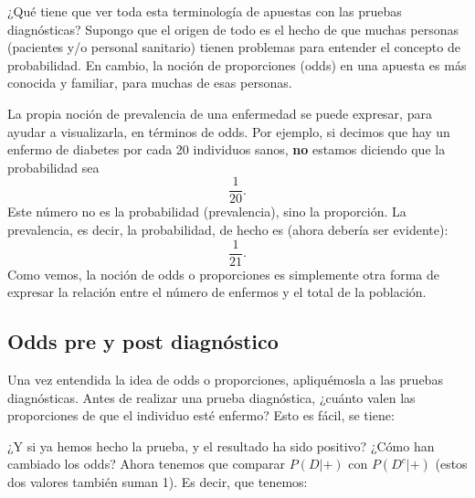 \documentclass[10pt,a4paper]{article}
\begin{document}
¿Qué tiene que ver toda esta terminología de apuestas con las pruebas diagnósticas? Supongo que el origen de todo es el hecho de que muchas personas (pacientes y/o personal sanitario) tienen problemas para entender el concepto de probabilidad. En cambio, la noción de proporciones (odds) en una apuesta es más conocida y familiar, para muchas de esas personas.

La propia noción de prevalencia de una enfermedad se puede expresar, para ayudar a visualizarla, en términos de odds. Por ejemplo, si decimos que hay un enfermo de diabetes por cada 20 individuos sanos, {\bf no} estamos diciendo que la probabilidad sea
\[\dfrac{1}{20}.\]
Este número no es la probabilidad (prevalencia), sino la proporción. La prevalencia, es decir, la probabilidad, de hecho es (ahora debería ser evidente):
\[\dfrac{1}{21}.\]
Como vemos, la noción de odds o proporciones es simplemente otra forma de expresar la relación entre el número de enfermos y el total de la población.

\subsection*{Odds pre y post diagnóstico}

Una vez entendida la idea de odds o proporciones, apliquémosla a las pruebas diagnósticas. Antes de realizar una prueba diagnóstica, ¿cuánto valen las proporciones de que el individuo esté enfermo? Esto es fácil, se tiene:
\begin{center}
\end{center}
¿Y si ya hemos hecho la prueba, y el resultado ha sido positivo? ¿Cómo han cambiado los odds? Ahora tenemos que comparar $P(D|+)$ con $P(D^c|+)$ (estos dos valores también suman 1). Es decir, que tenemos:
\begin{center}
\end{center}
\end{document}
